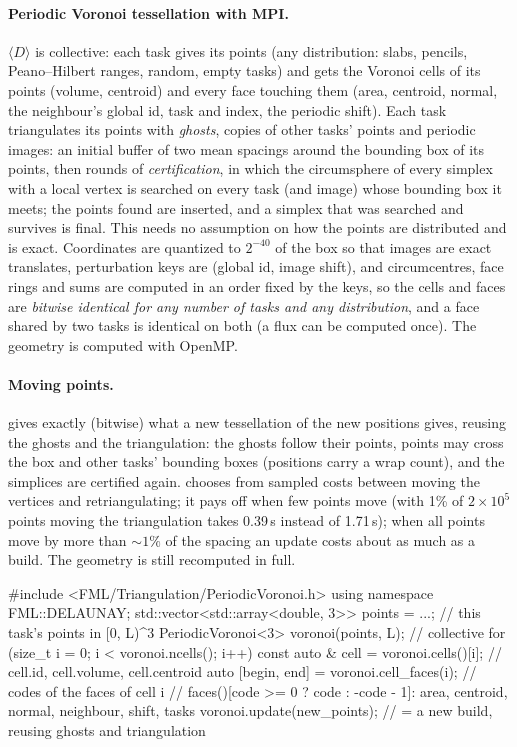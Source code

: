 \paragraph*{Periodic Voronoi tessellation with MPI.} $\langle D\rangle$ is collective: each task gives its
points (any distribution: slabs, pencils, Peano--Hilbert ranges, random, empty tasks) and gets the Voronoi cells of its points
(volume, centroid) and every face touching them (area, centroid, normal, the neighbour's global id, task and index, the periodic
shift). Each task triangulates its points with \emph{ghosts}, copies of other tasks' points and periodic images: an initial
buffer of two mean spacings around the bounding box of its points, then rounds of \emph{certification}, in which the
circumsphere of every simplex with a local vertex is searched on every task (and image) whose bounding box it meets; the points
found are inserted, and a simplex that was searched and survives is final. This needs no assumption on how the points are
distributed and is exact. Coordinates are quantized to $2^{-40}$ of the box so that images are exact translates, perturbation keys
are (global id, image shift), and circumcentres, face rings and sums are computed in an order fixed by the keys, so the cells and
faces are \emph{bitwise identical for any number of tasks and any distribution}, and a face shared by two tasks is identical on
both (a flux can be computed once). The geometry is computed with OpenMP.

\paragraph*{Moving points.}  gives exactly (bitwise) what a new tessellation of the new positions gives,
reusing the ghosts and the triangulation: the ghosts follow their points, points may cross the box and other tasks' bounding boxes
(positions carry a wrap count), and the simplices are certified again.  chooses from sampled costs
between moving the vertices and retriangulating; it pays off when few points move (with 1\% of $2\times10^5$ points moving the
triangulation takes 0.39\,s instead of 1.71\,s); when all points move by more than $\sim1\%$ of the spacing an update costs about
as much as a build. The geometry is still recomputed in full.

\begin{cppcode}
#include <FML/Triangulation/PeriodicVoronoi.h>
using namespace FML::DELAUNAY;
std::vector<std::array<double, 3>> points = ...;  // this task's points in [0, L)^3
PeriodicVoronoi<3> voronoi(points, L);            // collective
for (size_t i = 0; i < voronoi.ncells(); i++) {
    const auto & cell = voronoi.cells()[i];       // cell.id, cell.volume, cell.centroid
    auto [begin, end] = voronoi.cell_faces(i);    // codes of the faces of cell i
    // faces()[code >= 0 ? code : -code - 1]: area, centroid, normal, neighbour, shift, tasks
}
voronoi.update(new_points);                       // = a new build, reusing ghosts and triangulation
\end{cppcode}

